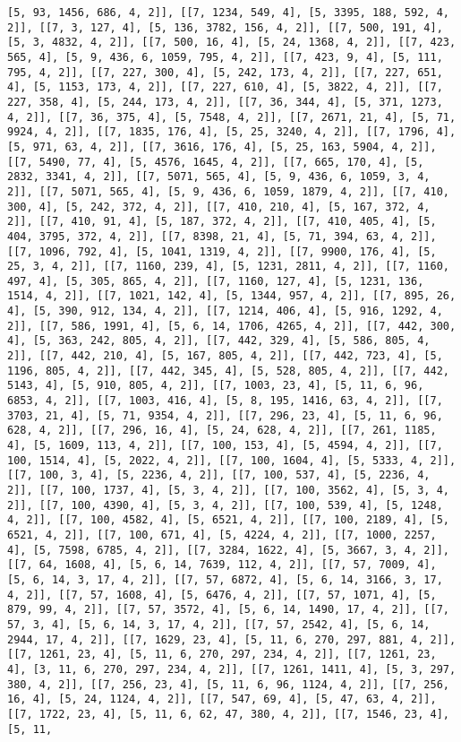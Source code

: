 \documentclass[12pt,fleqn]{article}\usepackage{../../common}
\begin{document}
\begin{verbatim}
[5, 93, 1456, 686, 4, 2]], [[7, 1234, 549, 4], [5, 3395, 188, 592, 4, 2]], [[7, 3, 127, 4], [5, 136, 3782, 156, 4, 2]], [[7, 500, 191, 4], [5, 3, 4832, 4, 2]], [[7, 500, 16, 4], [5, 24, 1368, 4, 2]], [[7, 423, 565, 4], [5, 9, 436, 6, 1059, 795, 4, 2]], [[7, 423, 9, 4], [5, 111, 795, 4, 2]], [[7, 227, 300, 4], [5, 242, 173, 4, 2]], [[7, 227, 651, 4], [5, 1153, 173, 4, 2]], [[7, 227, 610, 4], [5, 3822, 4, 2]], [[7, 227, 358, 4], [5, 244, 173, 4, 2]], [[7, 36, 344, 4], [5, 371, 1273, 4, 2]], [[7, 36, 375, 4], [5, 7548, 4, 2]], [[7, 2671, 21, 4], [5, 71, 9924, 4, 2]], [[7, 1835, 176, 4], [5, 25, 3240, 4, 2]], [[7, 1796, 4], [5, 971, 63, 4, 2]], [[7, 3616, 176, 4], [5, 25, 163, 5904, 4, 2]], [[7, 5490, 77, 4], [5, 4576, 1645, 4, 2]], [[7, 665, 170, 4], [5, 2832, 3341, 4, 2]], [[7, 5071, 565, 4], [5, 9, 436, 6, 1059, 3, 4, 2]], [[7, 5071, 565, 4], [5, 9, 436, 6, 1059, 1879, 4, 2]], [[7, 410, 300, 4], [5, 242, 372, 4, 2]], [[7, 410, 210, 4], [5, 167, 372, 4, 2]], [[7, 410, 91, 4], [5, 187, 372, 4, 2]], [[7, 410, 405, 4], [5, 404, 3795, 372, 4, 2]], [[7, 8398, 21, 4], [5, 71, 394, 63, 4, 2]], [[7, 1096, 792, 4], [5, 1041, 1319, 4, 2]], [[7, 9900, 176, 4], [5, 25, 3, 4, 2]], [[7, 1160, 239, 4], [5, 1231, 2811, 4, 2]], [[7, 1160, 497, 4], [5, 305, 865, 4, 2]], [[7, 1160, 127, 4], [5, 1231, 136, 1514, 4, 2]], [[7, 1021, 142, 4], [5, 1344, 957, 4, 2]], [[7, 895, 26, 4], [5, 390, 912, 134, 4, 2]], [[7, 1214, 406, 4], [5, 916, 1292, 4, 2]], [[7, 586, 1991, 4], [5, 6, 14, 1706, 4265, 4, 2]], [[7, 442, 300, 4], [5, 363, 242, 805, 4, 2]], [[7, 442, 329, 4], [5, 586, 805, 4, 2]], [[7, 442, 210, 4], [5, 167, 805, 4, 2]], [[7, 442, 723, 4], [5, 1196, 805, 4, 2]], [[7, 442, 345, 4], [5, 528, 805, 4, 2]], [[7, 442, 5143, 4], [5, 910, 805, 4, 2]], [[7, 1003, 23, 4], [5, 11, 6, 96, 6853, 4, 2]], [[7, 1003, 416, 4], [5, 8, 195, 1416, 63, 4, 2]], [[7, 3703, 21, 4], [5, 71, 9354, 4, 2]], [[7, 296, 23, 4], [5, 11, 6, 96, 628, 4, 2]], [[7, 296, 16, 4], [5, 24, 628, 4, 2]], [[7, 261, 1185, 4], [5, 1609, 113, 4, 2]], [[7, 100, 153, 4], [5, 4594, 4, 2]], [[7, 100, 1514, 4], [5, 2022, 4, 2]], [[7, 100, 1604, 4], [5, 5333, 4, 2]], [[7, 100, 3, 4], [5, 2236, 4, 2]], [[7, 100, 537, 4], [5, 2236, 4, 2]], [[7, 100, 1737, 4], [5, 3, 4, 2]], [[7, 100, 3562, 4], [5, 3, 4, 2]], [[7, 100, 4390, 4], [5, 3, 4, 2]], [[7, 100, 539, 4], [5, 1248, 4, 2]], [[7, 100, 4582, 4], [5, 6521, 4, 2]], [[7, 100, 2189, 4], [5, 6521, 4, 2]], [[7, 100, 671, 4], [5, 4224, 4, 2]], [[7, 1000, 2257, 4], [5, 7598, 6785, 4, 2]], [[7, 3284, 1622, 4], [5, 3667, 3, 4, 2]], [[7, 64, 1608, 4], [5, 6, 14, 7639, 112, 4, 2]], [[7, 57, 7009, 4], [5, 6, 14, 3, 17, 4, 2]], [[7, 57, 6872, 4], [5, 6, 14, 3166, 3, 17, 4, 2]], [[7, 57, 1608, 4], [5, 6476, 4, 2]], [[7, 57, 1071, 4], [5, 879, 99, 4, 2]], [[7, 57, 3572, 4], [5, 6, 14, 1490, 17, 4, 2]], [[7, 57, 3, 4], [5, 6, 14, 3, 17, 4, 2]], [[7, 57, 2542, 4], [5, 6, 14, 2944, 17, 4, 2]], [[7, 1629, 23, 4], [5, 11, 6, 270, 297, 881, 4, 2]], [[7, 1261, 23, 4], [5, 11, 6, 270, 297, 234, 4, 2]], [[7, 1261, 23, 4], [3, 11, 6, 270, 297, 234, 4, 2]], [[7, 1261, 1411, 4], [5, 3, 297, 380, 4, 2]], [[7, 256, 23, 4], [5, 11, 6, 96, 1124, 4, 2]], [[7, 256, 16, 4], [5, 24, 1124, 4, 2]], [[7, 547, 69, 4], [5, 47, 63, 4, 2]], [[7, 1722, 23, 4], [5, 11, 6, 62, 47, 380, 4, 2]], [[7, 1546, 23, 4], [5, 11, 
\end{verbatim}
\end{document}
